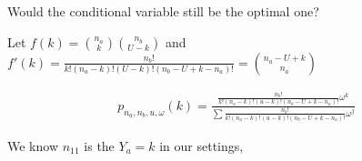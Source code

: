 Would the conditional variable still be the optimal one?


Let $f(k) = \binom{n_a}{k} \binom{n_b}{U-k}$ and $f'(k) = \frac{n_b!}{k!(n_a-k)!(U-k)!(n_b-U+k-n_a)!} = \binom{n_a - U + k}{n_a}$


\begin{align*}
	p_{n_a, n_b, u, \omega}(k) = \frac{\frac{n_b!}{k!(n_a-k)!(u-k)!(n_b-U+k-n_a)!}\omega^k}{\sum \frac{n_b!}{k!(n_a-k)!(u-k)!(n_b-U+k-n_a)!}\omega^j}
\end{align*}


We know $n_{11}$ is the $Y_a = k$ in our settings,










